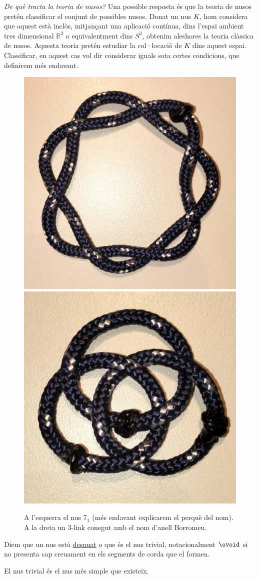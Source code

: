 \textit{De què tracta la teoria de nusos?}
Una possible resposta és que la teoria de nusos pretén classificar el conjunt de possibles nusos. Donat un nus $K$, hom considera que aquest està inclòs, mitjançant una aplicació contínua, dins l'espai ambient tres dimensional $\mathbb{R}^3$ o equivalentment dins $S^3$, obtenim aleshores la teoria clàssica de nusos. Aquesta teoria pretén estudiar la col·locació de $K$ dins aquest espai. Classificar, en aquest cas vol dir considerar iguals sota certes condicions, que definirem més endavant.

\begin{figure}
	\centering
	\includegraphics[width=0.45\linewidth]{img/7_1.jpg}
	\includegraphics[width=0.45\linewidth]{img/anell borromeu.jpg}
	\caption{A l'esquerra el nus $7_1$ (més endavant explicarem el perquè del nom). A la dreta un 3-link conegut amb el nom d'anell Borromeu. 
	}\label{fig:exemplesdenusosenmatematiques}
\end{figure}

\begin{definition}
	Diem que un nus està \underline{desnuat} o que és el nus trivial, notacionalment $\ovoid$ si no presenta cap creuament en els segments de corda que el formen.
\end{definition}

El nus trivial és el nus més simple que existeix.

